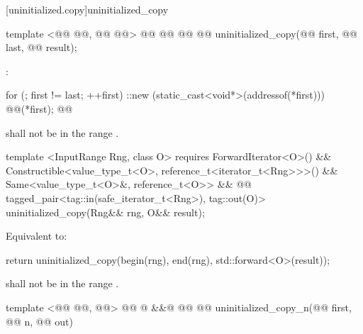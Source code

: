 [uninitialized.copy]{uninitialized_copy}
\begin{codeblock}
  template <@@ @@, @@
            @@>
    @@
             @@
             @@
  @@
    uninitialized_copy(@@ first, @@ last, @@ result);
\end{codeblock}

\setcounter{Paras}{0}
\pnum
\effects {}:
\begin{codeblock}
        for (; first != last; ++first)
          ::new (static_cast<void*>(addressof(*first)))
            @@(*first);
        @@
\end{codeblock}

{\color{addclr}
\pnum
\requires {} shall not be in the range \tcode{[first, last)}.

\begin{codeblock}
  template <InputRange Rng, class O>
    requires ForwardIterator<O>() &&
             Constructible<value_type_t<O>, reference_t<iterator_t<Rng>>>() &&
             Same<value_type_t<O>&, reference_t<O>> &&
             @@
  tagged_pair<tag::in(safe_iterator_t<Rng>), tag::out(O)>
    uninitialized_copy(Rng&& rng, O&& result);
\end{codeblock}

\pnum
\effects Equivalent to:
\begin{codeblock}
        return uninitialized_copy(begin(rng), end(rng), std::forward<O>(result));
\end{codeblock}
\pnum
\requires {} shall not be in the range \tcode{[first, last)}.
} %

\begin{codeblock}
  template <@@ @@, @@>
    @@
             @ \&\&@
             @@
  @@
    uninitialized_copy_n(@@ first, @@ n,
                         @@ out)
\end{codeblock}

